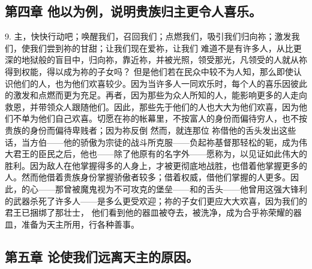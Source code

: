 
\subsection{第四章 他以为例，说明贵族归主更令人喜乐。}

9. 主，快快行动吧；唤醒我们，召回我们；点燃我们，吸引我们归向祢；激发我们，使我们尝到祢的甘甜；让我们现在爱祢，让我们 难道不是有许多人，从比更深的地狱般的盲目中，归向祢，靠近祢，并被光照，领受那光，凡领受的人就从祢得到权能，得以成为祢的子女吗？ 但是他们若在民众中较不为人知，那么即使认识他们的人，也为他们欢喜较少。因为当许多人一同欢乐时，每个人的喜乐因彼此的激发和点燃而更为充足。再者，因为那些为众人所知的人，能影响更多的人走向救恩，并带领众人跟随他们。因此，那些先于他们的人也大大为他们欢喜，因为他们不单为他们自己欢喜。切愿在祢的帐幕里，不按富人的身份而偏待穷人，也不按贵族的身份而偏待卑贱者；因为祢反倒 然而，就连那位 祢借他的舌头发出这些话，当方伯——他的骄傲为宗徒的战斗所克服——负起祢基督那轻松的轭，成为伟大君王的臣民之后，他也——除了他原有的名字外——愿称为，以见证如此伟大的胜利。因为敌人在他掌握得多的人身上，才被更彻底地战胜，也借着他掌握更多的人。然而他借着贵族身份掌握骄傲者较多；借着权威，借他们掌握的人更多。因此，的心——那曾被魔鬼视为不可攻克的堡垒——和的舌头——他曾用这强大锋利的武器杀死了许多人——是多么更受欢迎；祢的子女们更应大大欢喜，因为我们的君王已捆绑了那壮士， 他们看到他的器皿被夺去，被洗净，成为合乎祢荣耀的器皿，准备为天主所用，行各种善事。\par


\subsection{第五章 论使我们远离天主的原因。}

